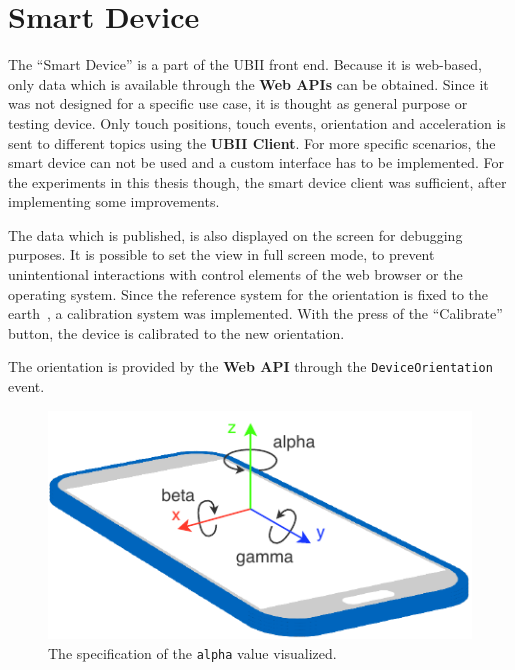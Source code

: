 \section{Smart Device}\label{section:smart-device}

The \enquote{Smart Device} is a part of the \ac{UBII} front end. Because it is web-based, only data which is available through the \textbf{Web \acp{API}} can be obtained. Since it was not designed for a specific use case, it is thought as general purpose or testing device. Only touch positions, touch events, orientation and acceleration is sent to different topics using the \textbf{\ac{UBII} Client}. For more specific scenarios, the smart device can not be used and a custom interface has to be implemented. For the experiments in this thesis though, the smart device client was sufficient, after implementing some improvements.

The data which is published, is also displayed on the screen for debugging purposes. It is possible to set the view in full screen mode, to prevent unintentional interactions with control elements of the web browser or the operating system. Since the reference system for the orientation is fixed to the earth~\cite[Chapter~4.1]{DevicesandSensorsWorkingGroup.2019}, a calibration system was implemented. With the press of the \enquote{Calibrate} button, the device is calibrated to the new orientation.

The orientation is provided by the \textbf{Web API} through the \lstinline{DeviceOrientation} event. %





\begin{figure}[htpb]
  \centering
  \includegraphics[width=12cm]{figures/webapi_device_orientation.pdf}
  \caption[Device Orientation]{The specification of the \lstinline{alpha} value visualized.}\label{fig:ubii_front_end}
\end{figure}


